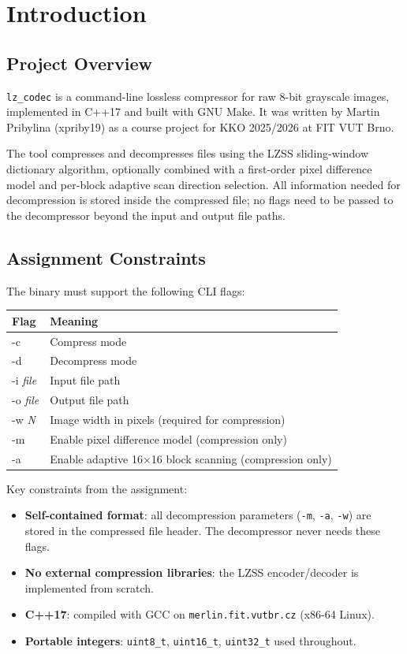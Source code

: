 \section{Introduction}

\subsection{Project Overview}

\texttt{lz\_codec} is a command-line lossless compressor for raw 8-bit grayscale images,
implemented in C++17 and built with GNU Make.
It was written by Martin Pribylina (xpriby19) as a course project for KKO 2025/2026
at FIT VUT Brno.

The tool compresses and decompresses files using the LZSS sliding-window dictionary algorithm,
optionally combined with a first-order pixel difference model and per-block adaptive scan
direction selection.
All information needed for decompression is stored inside the compressed file; no flags
need to be passed to the decompressor beyond the input and output file paths.

\subsection{Assignment Constraints}

The binary must support the following CLI flags:

\begin{center}
\begin{tabular}{>{\ttfamily}l l}
\toprule
\textbf{Flag} & \textbf{Meaning} \\
\midrule
-c          & Compress mode \\
-d          & Decompress mode \\
-i \textit{file} & Input file path \\
-o \textit{file} & Output file path \\
-w \textit{N}    & Image width in pixels (required for compression) \\
-m          & Enable pixel difference model (compression only) \\
-a          & Enable adaptive 16$\times$16 block scanning (compression only) \\
\bottomrule
\end{tabular}
\end{center}

Key constraints from the assignment:
\begin{itemize}
  \item \textbf{Self-contained format}: all decompression parameters (\texttt{-m}, \texttt{-a}, \texttt{-w}) are stored
        in the compressed file header. The decompressor never needs these flags.
  \item \textbf{No external compression libraries}: the LZSS encoder/decoder is implemented from scratch.
  \item \textbf{C++17}: compiled with GCC on \texttt{merlin.fit.vutbr.cz} (x86-64 Linux).
  \item \textbf{Portable integers}: \texttt{uint8\_t}, \texttt{uint16\_t}, \texttt{uint32\_t} used throughout.
\end{itemize}

